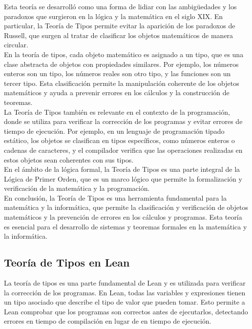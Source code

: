 \documentclass{article}
\begin{document}
Esta teoría se desarrolló como una forma de lidiar con las ambigüedades y los paradoxos que surgieron en la lógica y la matemática en el siglo XIX. En particular, la Teoría de Tipos permite evitar la aparición de los paradoxos de Russell, que surgen al tratar de clasificar los objetos matemáticos de manera circular.\\

En la teoría de tipos, cada objeto matemático es asignado a un tipo, que es una clase abstracta de objetos con propiedades similares. Por ejemplo, los números enteros son un tipo, los números reales son otro tipo, y las funciones son un tercer tipo. Esta clasificación permite la manipulación coherente de los objetos matemáticos y ayuda a prevenir errores en los cálculos y la construcción de teoremas.\\

La Teoría de Tipos también es relevante en el contexto de la programación, donde se utiliza para verificar la corrección de los programas y evitar errores de tiempo de ejecución. Por ejemplo, en un lenguaje de programación tipado estático, los objetos se clasifican en tipos específicos, como números enteros o cadenas de caracteres, y el compilador verifica que las operaciones realizadas en estos objetos sean coherentes con sus tipos.\\

En el ámbito de la lógica formal, la Teoría de Tipos es una parte integral de la Lógica de Primer Orden, que es un marco lógico que permite la formalización y verificación de la matemática y la programación.\\

En conclusión, la Teoría de Tipos es una herramienta fundamental para la matemática y la informática, que permite la clasificación y verificación de objetos matemáticos y la prevención de errores en los cálculos y programas. Esta teoría es esencial para el desarrollo de sistemas y teoremas formales en la matemática y la informática.

\subsection{Teoría de Tipos en Lean}
La teoría de tipos es una parte fundamental de Lean y es utilizada para
verificar la corrección de los programas. En Lean, todas las variables y
expresiones tienen un tipo asociado que describe el tipo de valor que
pueden tomar. Esto permite a Lean comprobar que los programas son correctos
antes de ejecutarlos, detectando errores en tiempo de compilación en lugar
de en tiempo de ejecución.\\
\end{document}
